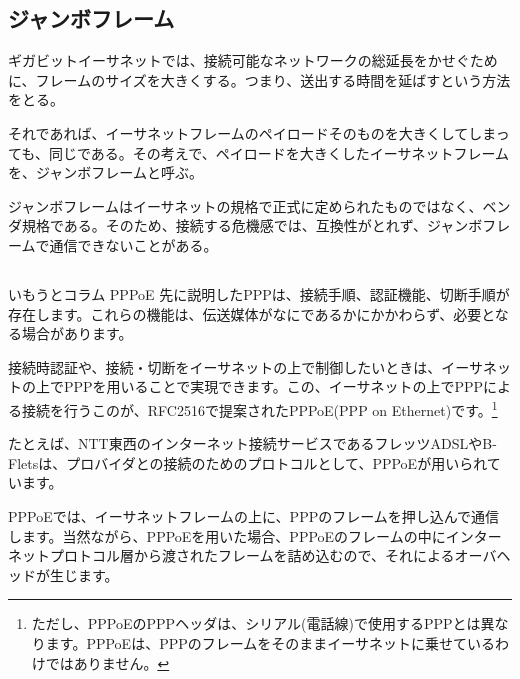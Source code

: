 \subsection{ジャンボフレーム}
ギガビットイーサネットでは、接続可能なネットワークの総延長をかせぐために、フレームのサイズを大きくする。つまり、送出する時間を延ばすという方法をとる。

それであれば、イーサネットフレームのペイロードそのものを大きくしてしまっても、同じである。その考えで、ペイロードを大きくしたイーサネットフレームを、ジャンボフレームと呼ぶ。

ジャンボフレームはイーサネットの規格で正式に定められたものではなく、ベンダ規格である。そのため、接続する危機感では、互換性がとれず、ジャンボフレームで通信できないことがある。


\subsection*{}
\begin{itembox}[l]{いもうとコラム PPPoE}
先に説明したPPPは、接続手順、認証機能、切断手順が存在します。これらの機能は、伝送媒体がなにであるかにかかわらず、必要となる場合があります。

接続時認証や、接続・切断をイーサネットの上で制御したいときは、イーサネットの上でPPPを用いることで実現できます。この、イーサネットの上でPPPによる接続を行うこのが、RFC2516で提案されたPPPoE(PPP on Ethernet)です。\footnote{ただし、PPPoEのPPPヘッダは、シリアル(電話線)で使用するPPPとは異なります。PPPoEは、PPPのフレームをそのままイーサネットに乗せているわけではありません。 }

たとえば、NTT東西のインターネット接続サービスであるフレッツADSLやB-Fletsは、プロバイダとの接続のためのプロトコルとして、PPPoEが用いられています。

PPPoEでは、イーサネットフレームの上に、PPPのフレームを押し込んで通信します。当然ながら、PPPoEを用いた場合、PPPoEのフレームの中にインターネットプロトコル層から渡されたフレームを詰め込むので、それによるオーバヘッドが生じます。

\end{itembox}


